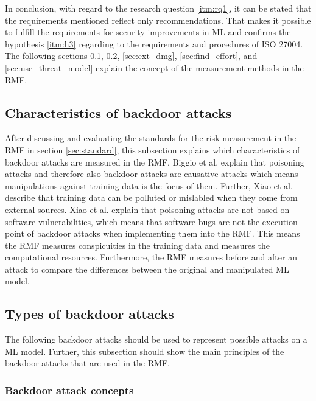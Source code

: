 In conclusion, with regard to the research question \ref{itm:rq1}, it can be stated that the requirements mentioned reflect only recommendations. That makes it possible to fulfill the requirements for security improvements in ML and confirms the hypothesis \ref{itm:h3} regarding to the requirements and procedures of ISO 27004. The following sections \ref{sec:charac_backdoor},
\ref{sec:backdoor_types}, \ref{sec:ext_dmg}, \ref{sec:find_effort}, and \ref{sec:use_threat_model} explain the concept of the measurement methods in the RMF.

\subsection{Characteristics of backdoor attacks}
\label{sec:charac_backdoor}

After discussing and evaluating the standards for the risk measurement in the RMF in section \ref{sec:standard}, this subsection explains which characteristics of backdoor attacks are measured in the
RMF. Biggio et al. \cite{DBLP:conf/icml/BiggioNL12} explain that poisoning attacks and therefore also backdoor attacks are causative attacks which means manipulations against training data is the focus of them. Further, Xiao et al. \cite{DBLP:conf/sp/XiaoLZX18} describe that training data can be polluted or mislabled when they come from external sources. Xiao et al. explain that poisoning attacks are not based on software vulnerabilities, which means that software bugs are not the execution point of backdoor attacks when implementing them into the RMF. This means the RMF measures conspicuities in the training data and measures the computational resources. Furthermore, the RMF measures before and after an attack to compare the differences between the original and manipulated ML model.

\subsection{Types of backdoor attacks}
\label{sec:backdoor_types}

The following backdoor attacks should be used to represent possible attacks on a ML model. Further, this subsection should show the main principles of the backdoor attacks that are used in the RMF.

\subsubsection*{Backdoor attack concepts}

